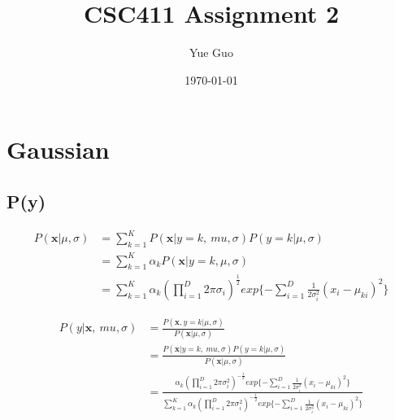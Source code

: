 \documentclass[letterpaper, 12]{article}
\date{\today}
\title{CSC411 Assignment 2}
\author{Yue Guo}
\begin{document}
\maketitle


\section{Gaussian}

\subsection{P(y)}

\begin{equation*}
\begin{split}
P( \bm{x} | \mu ,  \sigma) &= \sum_{k = 1}^{K}  P( \bm{x} | y = k, \ mu ,  \sigma) P(y = k | \mu, \sigma) \\
&=  \sum_{k = 1}^{K} \alpha_{k} P( \bm{x} | y = k, \mu ,  \sigma) \\
&= \sum_{k = 1}^{K} \alpha_{k} (\prod_{i=1}^{D} 2\pi \sigma_{i})^{\frac{1}{2}} exp\{{- \sum_{i=1}^{D}} \frac{1}{2 \sigma_{i} ^2} (x_{i} - \mu_{ki})^2 \} 
\end{split}
\end{equation*}
 
\begin{equation*}
\begin{split}
P(y | \bm{x} , \ mu ,  \sigma) &= \frac{P( \bm{x}, y = k | \mu ,  \sigma)}{P( \bm{x} |  \mu ,  \sigma)}
\\
&= \frac{P( \bm{x} | y = k, \ mu ,  \sigma) P(y = k | \mu ,  \sigma)}{P( \bm{x} |  \mu ,  \sigma)}
\\
&=\frac{ \alpha_{k} (\prod_{i=1}^{D} 2\pi \sigma_{i} ^{2})^{-\frac{1}{2}}  exp\{{- \sum_{i=1}^{D}} \frac{1}
{2 \sigma_{i} ^2} (x_{i} - \mu_{ki})^2 \}  }{\sum_{k=1}^{K} \alpha_{k} (\prod_{i=1}^{D} 2\pi \sigma_{i} ^{2})^{-\frac{1}{2}}  exp\{{- \sum_{i=1}^{D}} \frac{1}
{2 \sigma_{i} ^2} (x_{i} - \mu_{ki})^2 \}} \\
\end{split}
\end{equation*}
\end{document}

